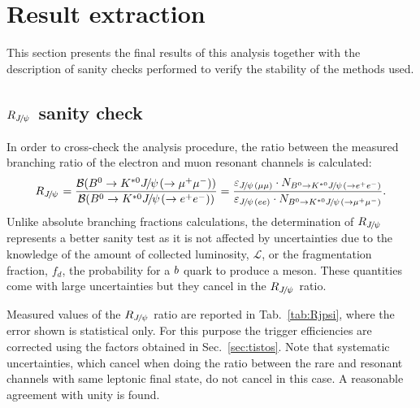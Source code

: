 \section{Result extraction}
\label{sec:RKst_result}

This section presents the final results of this analysis
together with the description of sanity checks performed to verify the stability
of the methods used.

\subsection{$R_{\jpsi}$ sanity check}
\label{sec:Rjpsi}

In order to cross-check the analysis procedure, the ratio between the
measured branching ratio of the electron and muon resonant channels is calculated:
%
\begin{equation}
R_{\jpsi} = \frac{\BR(\Bz\to\Kstarz\jpsi(\to \mumu))} {\BR(\Bz\to\Kstarz\jpsi(\to \epem))} 
= \frac{\varepsilon_{\jpsi(\mu\mu)} \cdot N_{\Bz\to\Kstarz\jpsi(\to \epem)}}{\varepsilon_{\jpsi(ee)} 
\cdot N_{\Bz\to\Kstarz\jpsi(\to \mumu)}}.
\end{equation}
%
Unlike absolute branching fractions calculations, the determination of $R_{\jpsi}$ represents a better
sanity test as it is not affected by uncertainties due to the knowledge of the amount of collected 
luminosity, $\mathcal{L}$, or the fragmentation fraction, $f_d$, the probability for a ${b}$
quark to produce a \Bz meson. These quantities come with large uncertainties but they cancel
in the $R_{\jpsi}$ ratio.

%
%


Measured values of the $R_{\jpsi}$ ratio are reported in Tab.~\ref{tab:Rjpsi}, where the error 
shown is statistical only. For this purpose the trigger efficiencies are corrected using the 
factors obtained in Sec.~\ref{sec:tistos}. Note that systematic uncertainties, 
which cancel when doing the ratio between the rare and
resonant channels with same leptonic final state, do not cancel in this case.
A reasonable agreement with unity is found.

